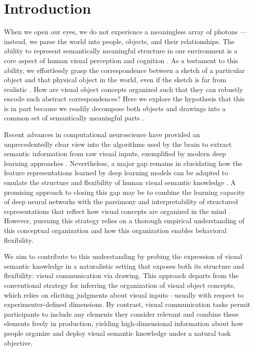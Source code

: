 \documentclass[10pt,letterpaper]{article}
\begin{document}
\section{Introduction}


When we open our eyes, we do not experience a meaningless array of photons --- instead, we parse the world into people, objects, and their relationships. 
The ability to represent semantically meaningful structure in our environment is a core aspect of human visual perception and cognition \cite{navon1977forest}. 
As a testament to this ability, we effortlessly grasp the correspondence between a sketch of a particular object and that physical object in the world, even if the sketch is far from realistic \cite{eitz2012humans}. 
How are visual object concepts organized such that they can robustly encode such abstract correspondences?
Here we explore the hypothesis that this is in part because we readily decompose both objects and drawings into a common set of semantically meaningful parts \cite{biederman1988surface}. 

Recent advances in computational neuroscience have provided an unprecedentedly clear view into the algorithms used by the brain to extract semantic information from raw visual inputs, exemplified by modern deep learning approaches \cite{yamins2014performance}.
Nevertheless, a major gap remains in elucidating how the feature representations learned by deep learning models can be adapted to emulate the structure and flexibility of human visual semantic knowledge \cite{lake2017building}.
A promising approach to closing this gap may be to combine the learning capacity of deep neural networks with the parsimony and interpretability of structured representations that reflect how visual concepts are organized in the mind \cite{battaglia2018relational}. 
However, pursuing this strategy relies on a thorough empirical understanding of this conceptual organization and how this organization enables behavioral flexibility.  

We aim to contribute to this understanding by probing the expression of visual semantic knowledge in a naturalistic setting that exposes both its structure and flexibility: visual communication via drawing. 
This approach departs from the conventional strategy for inferring the organization of visual object concepts, which relies on eliciting judgments about visual inputs---usually with respect to experimenter-defined dimensions. 
By contrast, visual communication tasks permit participants to include any elements they consider relevant and combine these elements freely in production, yielding high-dimensional information about how people organize and deploy visual semantic knowledge under a natural task objective. 
\end{document}
